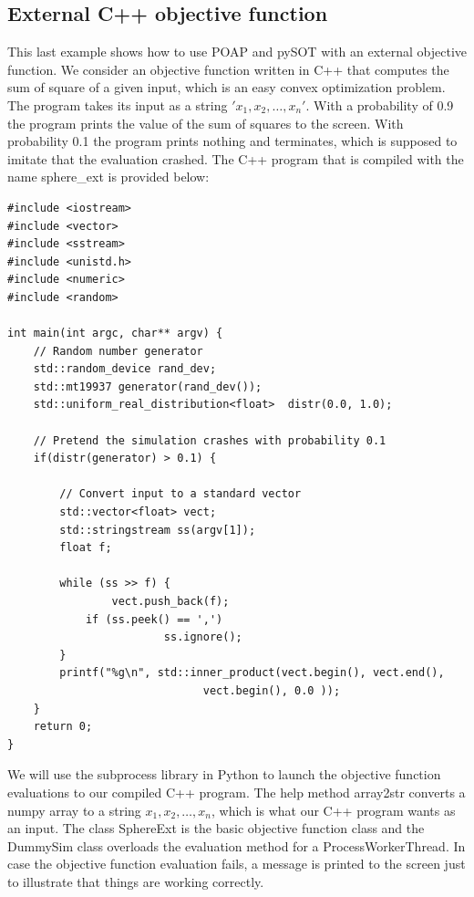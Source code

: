 \documentclass[]{article}
\begin{document}
\subsection{External C++ objective function}
This last example shows how to use POAP and pySOT with an external objective function. We consider an objective function written in C++ that computes the sum of square of a given input, which is an easy convex optimization problem. The program takes its input as a string $'x_1,x_2,\ldots,x_n'$. With a probability of 0.9 the program prints the value of the sum of squares to the screen. With probability 0.1 the program prints nothing and terminates, which is supposed to imitate that the evaluation crashed. The C++ program that is compiled with the name sphere\_ext is provided below:
\begin{lstlisting}
#include <iostream>
#include <vector>
#include <sstream>
#include <unistd.h>
#include <numeric>
#include <random>

int main(int argc, char** argv) {
	// Random number generator
	std::random_device rand_dev;
	std::mt19937 generator(rand_dev());
	std::uniform_real_distribution<float>  distr(0.0, 1.0);

	// Pretend the simulation crashes with probability 0.1
  	if(distr(generator) > 0.1) {

		// Convert input to a standard vector
		std::vector<float> vect;
		std::stringstream ss(argv[1]);
		float f;

		while (ss >> f) {
    			vect.push_back(f);
			if (ss.peek() == ',')
    	    			ss.ignore();
		}
   		printf("%g\n", std::inner_product(vect.begin(), vect.end(), 
   	 				          vect.begin(), 0.0 ));
	}
	return 0;
}
\end{lstlisting}
We will use the subprocess library in Python to launch the objective function evaluations to our compiled C++ program. The help method array2str converts a numpy array to a string \textquotesingle$x_1,x_2,\ldots,x_n$\textquotesingle, which is what our C++ program wants as an input. The class SphereExt is the basic objective function class and the DummySim class overloads the evaluation method for a ProcessWorkerThread. In case the objective function evaluation fails, a message is printed to the screen just to illustrate that things are working correctly.
\end{document}
